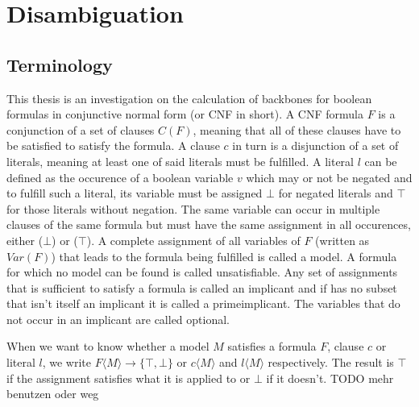 \section{Disambiguation}
\subsection{Terminology}
This thesis is an investigation on the calculation of backbones for boolean formulas in conjunctive normal form (or CNF in short). A CNF formula $F$ is a conjunction of a set of clauses $C(F)$, meaning that all of these clauses have to be satisfied to satisfy the formula. A clause $c$ in turn is a disjunction of a set of literals, meaning at least one of said literals must be fulfilled. A literal $l$ can be defined as the occurence of a boolean variable $v$ which may or not be negated and to fulfill such a literal, its variable must be assigned $\bot$ for negated literals and $\top$ for those literals without negation. The same variable can occur in multiple clauses of the same formula but must have the same assignment in all occurences, either ($\bot$) or ($\top$). A complete assignment of all variables of $F$ (written as $Var(F)$) that leads to the formula being fulfilled is called a model. A formula for which no model can be found is called unsatisfiable. Any set of assignments that is sufficient to satisfy a formula is called an implicant and if has no subset that isn't itself an implicant it is called a primeimplicant. The variables that do not occur in an implicant are called optional.


When we want to know whether a model $M$ satisfies a formula $F$, clause $c$ or literal $l$, we write $F\langle M\rangle \rightarrow \{\top,\bot\}$ or $c\langle M\rangle$ and $l\langle M\rangle$ respectively. The result is $\top$ if the assignment satisfies what it is applied to or $\bot$ if it doesn't. TODO mehr benutzen oder weg

